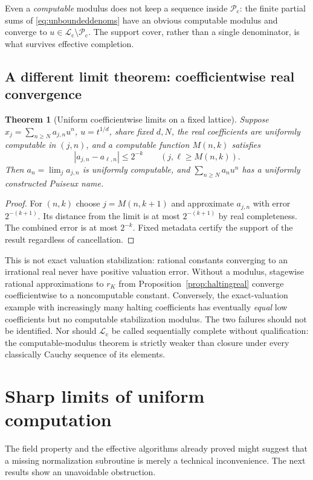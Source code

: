 \documentclass[11pt,letterpaper]{article}
\numberwithin{equation}{section}
\newtheorem{theorem}{Theorem}[section]
\theoremstyle{definition}
\theoremstyle{remark}
\newcommand{\Lc}{\mathcal L_{\mathrm c}}
\newcommand{\Pc}{\mathcal P_{\mathrm c}}
\begin{document}
Even a \emph{computable} modulus does not keep a sequence inside $\Pc$:
the finite partial sums of \eqref{eq:unboundeddenoms} have an obvious
computable modulus and converge to $u\in\Lc\setminus\Pc$. The support
cover, rather than a single denominator, is what survives effective
completion.


\subsection{A different limit theorem: coefficientwise real convergence}
\begin{theorem}[Uniform coefficientwise limits on a fixed lattice]
\label{thm:coefficient-limit}
Suppose $x_j=\sum_{n\ge N}a_{j,n}u^n$, $u=t^{1/d}$, share fixed $d,N$,
the real coefficients are uniformly computable in $(j,n)$, and a computable
function $M(n,k)$ satisfies
\[
 |a_{j,n}-a_{\ell,n}|\le 2^{-k}\qquad(j,\ell\ge M(n,k)).
\]
Then $a_n=\lim_j a_{j,n}$ is uniformly computable, and
$\sum_{n\ge N}a_nu^n$ has a uniformly constructed Puiseux name.
\end{theorem}
\begin{proof}
For $(n,k)$ choose $j=M(n,k+1)$ and approximate $a_{j,n}$ with error
$2^{-(k+1)}$. Its distance from the limit is at most $2^{-(k+1)}$ by real
completeness. The combined error is at most $2^{-k}$. Fixed metadata certify
the support of the result regardless of cancellation.
\end{proof}
This is not exact valuation stabilization: rational constants converging to
an irrational real never have positive valuation error. Without a modulus,
stagewise rational approximations to $r_K$ from
Proposition~\ref{prop:haltingreal} converge coefficientwise to a noncomputable
constant. Conversely, the exact-valuation example with increasingly many
halting coefficients has eventually \emph{equal} low coefficients but no
computable stabilization modulus. The two failures should not be identified.
Nor should $\Lc$ be called sequentially complete without qualification: the
computable-modulus theorem is strictly weaker than closure under every
classically Cauchy sequence of its elements.

\section{Sharp limits of uniform computation}
\label{sec:uniformlimits}

The field property and the effective algorithms already proved might suggest
that a missing normalization subroutine is merely a technical inconvenience.
The next results show an unavoidable obstruction.
\end{document}
